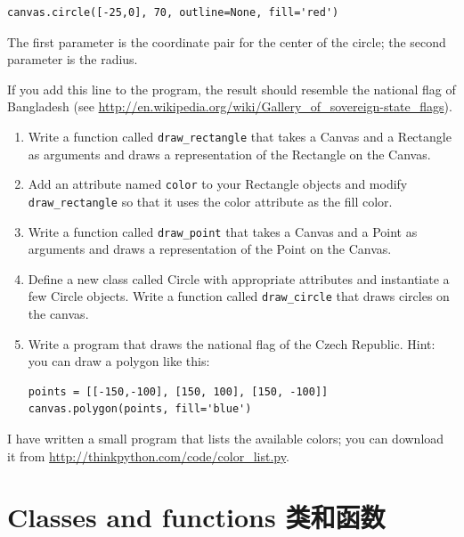 \documentclass[10pt]{book}
\begin{document}
\begin{CJK}{UTF8}{gbsn}
\begin{exercise}
\begin{verbatim}
canvas.circle([-25,0], 70, outline=None, fill='red')
\end{verbatim}

The first parameter is the coordinate pair for the center of the
circle; the second parameter is the radius.

If you add this line to the program, 
the result should resemble the national flag of Bangladesh
(see \url{http://en.wikipedia.org/wiki/Gallery_of_sovereign-state_flags}).

\begin{enumerate}

\item Write a function called \verb"draw_rectangle" that takes a
  Canvas and a Rectangle as arguments and draws a
  representation of the Rectangle on the Canvas.

\item Add an attribute named {\tt color} to your Rectangle objects and
  modify \verb"draw_rectangle" so that it uses the color attribute as
  the fill color.

\item Write a function called \verb"draw_point" that takes a
  Canvas and a Point as arguments and draws a
  representation of the Point on the Canvas.

\item Define a new class called Circle with appropriate attributes and
  instantiate a few Circle objects.  Write a function called
  \verb"draw_circle" that draws circles on the canvas.

\item Write a program that draws the national flag of the Czech Republic.
Hint: you can draw a polygon like this:

\begin{verbatim}
points = [[-150,-100], [150, 100], [150, -100]]
canvas.polygon(points, fill='blue')
\end{verbatim}

\end{enumerate}

I have written a small program that lists the available colors;
you can download it from \url{http://thinkpython.com/code/color_list.py}.

\end{exercise}


\chapter{Classes and functions 类和函数}
\label{time}


\end{CJK}
\end{document}
